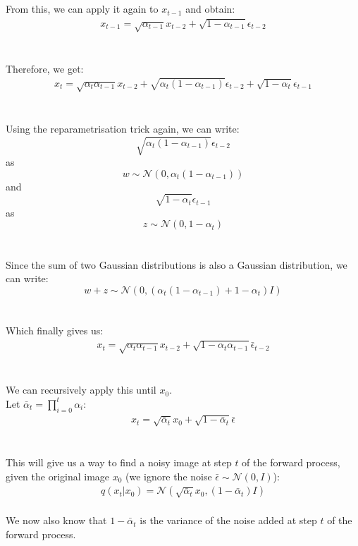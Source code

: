 \documentclass{article}
\begin{document}
\\\\
From this, we can apply it again to $x_{t-1}$ and obtain:
\begin{gather*}
  x_{t-1} = \sqrt{\alpha_{t-1}} x_{t-2} + \sqrt{1 - \alpha_{t-1}} \epsilon_{t - 2}
\end{gather*}
\\\\
Therefore, we get:
\begin{gather*}
  x_t = \sqrt{\alpha_t \alpha_{t-1}} x_{t-2} + \sqrt{\alpha_t(1 - \alpha_{t-1})} \epsilon_{t - 2} + \sqrt{1 - \alpha_t} \epsilon_{t - 1}
\end{gather*}
\\\\
Using the reparametrisation trick again, we can write:
$$\sqrt{\alpha_t(1 - \alpha_{t-1})} \epsilon_{t - 2}$$ 
as 
$$w \sim \mathcal{N}(0, \alpha_t(1 - \alpha_{t-1}))$$
and
$$\sqrt{1 - \alpha_t} \epsilon_{t - 1}$$
as
$$z \sim \mathcal{N}(0, 1 - \alpha_t)$$
\\\\
Since the sum of two Gaussian distributions is also a Gaussian distribution, we can write:
$$w + z \sim \mathcal{N}(0, (\alpha_t(1 - \alpha_{t-1}) + 1 - \alpha_t)I)$$
\\\\
Which finally gives us:
\begin{gather*}
  x_t = \sqrt{\alpha_t \alpha_{t-1}} x_{t-2} + \sqrt{1 - \alpha_t \alpha_{t-1}} \bar{\epsilon}_{t - 2}
\end{gather*}
\\\\
We can recursively apply this until $x_0$. \\
Let $\bar{\alpha}_t = \prod_{i=0}^{t}{\alpha_i}$:
\begin{gather}
  x_t = \sqrt{\bar{\alpha}_t} x_0 + \sqrt{1 - \bar{\alpha}_t} \bar{\epsilon} \label{eq:3}
\end{gather}
\\\\
This will give us a way to find a noisy image at step $t$ of the forward process, given the original image $x_0$ (we ignore the noise $\bar{\epsilon} \sim \mathcal{N}(0, I)$):
\begin{gather}
  q(x_t | x_0) = \mathcal{N}(\sqrt{\bar{\alpha}_t} x_0, (1 - \bar{\alpha}_t)I) \label{eq:4}
\end{gather}
\\
We now also know that $1 - \bar{\alpha}_t$ is the variance of the noise added at step $t$ of the forward process. \cite{nichol2021improved}
\end{document}
